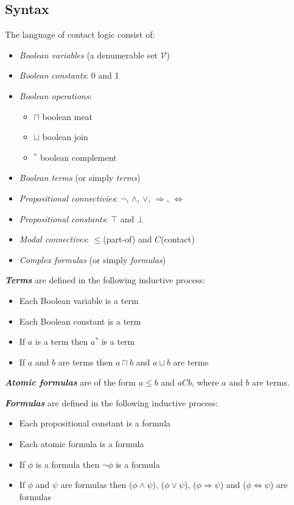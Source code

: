 \documentclass{article}
\newcommand\V{\mathcal{V}}
\begin{document}
	\subsection{Syntax}
	The language of contact logic consist of:
	\begin{itemize}
		\item \textit{Boolean variables} (a denumerable set $\V$)
		\item \textit{Boolean constants}: 0 and 1
		\item \textit{Boolean operations}:
		\begin{itemize}
			\item $\sqcap$ boolean meat
			\item $\sqcup$ boolean join
			\item $^*$ boolean complement
		\end{itemize}
		\item \textit{Boolean terms} (or simply \textit{terms})
		\item \textit{Propositional connectivies}: $\neg$, $\land$, $\lor$, $\Rightarrow$, $\Leftrightarrow$
		\item \textit{Propositional constants}: $\top$ and $\bot$
		\item \textit{Modal connectives}: $\leq$(part-of) and $C$(contact)
		\item \textit{Complex formulas} (or simply \textit{formulas})
	\end{itemize}

	\noindent\textbf{\textit{Terms}} are defined in the following inductive process:
	\begin{itemize}
		\item Each Boolean variable is a term
		\item Each Boolean constant is a term
		\item If $a$ is a term then $a^*$ is a term
		\item If $a$ and $b$ are terms then $a \sqcap b$ and $a \sqcup b$ are terms
	\end{itemize}

	\noindent\textbf{\textit{Atomic formulas}} are of the form $a \leq b$ and $aCb$, where $a$ and $b$ are terms.

	\noindent\textbf{\textit{Formulas}} are defined in the following inductive process:
	\begin{itemize}
		\item Each propositional constant is a formula
		\item Each atomic formula is a formula
		\item If $\phi$ is a formula then $\neg\phi$ is a formula
		\item If $\phi$ and $\psi$ are formulas then ($\phi \land \psi$), ($\phi \lor \psi$), ($\phi \Rightarrow \psi$) and ($\phi \Leftrightarrow \psi$) are formulas
	\end{itemize}
\end{document}

